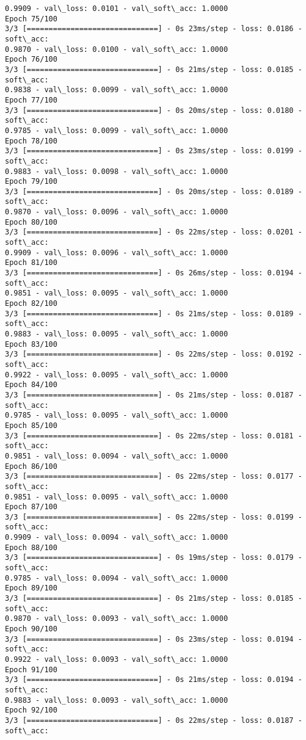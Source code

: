\documentclass[11pt]{article}
\begin{document}
\begin{Verbatim}[commandchars=\\\{\}]
0.9909 - val\_loss: 0.0101 - val\_soft\_acc: 1.0000
Epoch 75/100
3/3 [==============================] - 0s 23ms/step - loss: 0.0186 - soft\_acc:
0.9870 - val\_loss: 0.0100 - val\_soft\_acc: 1.0000
Epoch 76/100
3/3 [==============================] - 0s 21ms/step - loss: 0.0185 - soft\_acc:
0.9838 - val\_loss: 0.0099 - val\_soft\_acc: 1.0000
Epoch 77/100
3/3 [==============================] - 0s 20ms/step - loss: 0.0180 - soft\_acc:
0.9785 - val\_loss: 0.0099 - val\_soft\_acc: 1.0000
Epoch 78/100
3/3 [==============================] - 0s 23ms/step - loss: 0.0199 - soft\_acc:
0.9883 - val\_loss: 0.0098 - val\_soft\_acc: 1.0000
Epoch 79/100
3/3 [==============================] - 0s 20ms/step - loss: 0.0189 - soft\_acc:
0.9870 - val\_loss: 0.0096 - val\_soft\_acc: 1.0000
Epoch 80/100
3/3 [==============================] - 0s 22ms/step - loss: 0.0201 - soft\_acc:
0.9909 - val\_loss: 0.0096 - val\_soft\_acc: 1.0000
Epoch 81/100
3/3 [==============================] - 0s 26ms/step - loss: 0.0194 - soft\_acc:
0.9851 - val\_loss: 0.0095 - val\_soft\_acc: 1.0000
Epoch 82/100
3/3 [==============================] - 0s 21ms/step - loss: 0.0189 - soft\_acc:
0.9883 - val\_loss: 0.0095 - val\_soft\_acc: 1.0000
Epoch 83/100
3/3 [==============================] - 0s 22ms/step - loss: 0.0192 - soft\_acc:
0.9922 - val\_loss: 0.0095 - val\_soft\_acc: 1.0000
Epoch 84/100
3/3 [==============================] - 0s 21ms/step - loss: 0.0187 - soft\_acc:
0.9785 - val\_loss: 0.0095 - val\_soft\_acc: 1.0000
Epoch 85/100
3/3 [==============================] - 0s 22ms/step - loss: 0.0181 - soft\_acc:
0.9851 - val\_loss: 0.0094 - val\_soft\_acc: 1.0000
Epoch 86/100
3/3 [==============================] - 0s 22ms/step - loss: 0.0177 - soft\_acc:
0.9851 - val\_loss: 0.0095 - val\_soft\_acc: 1.0000
Epoch 87/100
3/3 [==============================] - 0s 22ms/step - loss: 0.0199 - soft\_acc:
0.9909 - val\_loss: 0.0094 - val\_soft\_acc: 1.0000
Epoch 88/100
3/3 [==============================] - 0s 19ms/step - loss: 0.0179 - soft\_acc:
0.9785 - val\_loss: 0.0094 - val\_soft\_acc: 1.0000
Epoch 89/100
3/3 [==============================] - 0s 21ms/step - loss: 0.0185 - soft\_acc:
0.9870 - val\_loss: 0.0093 - val\_soft\_acc: 1.0000
Epoch 90/100
3/3 [==============================] - 0s 23ms/step - loss: 0.0194 - soft\_acc:
0.9922 - val\_loss: 0.0093 - val\_soft\_acc: 1.0000
Epoch 91/100
3/3 [==============================] - 0s 21ms/step - loss: 0.0194 - soft\_acc:
0.9883 - val\_loss: 0.0093 - val\_soft\_acc: 1.0000
Epoch 92/100
3/3 [==============================] - 0s 22ms/step - loss: 0.0187 - soft\_acc:

\end{Verbatim}
\end{document}
